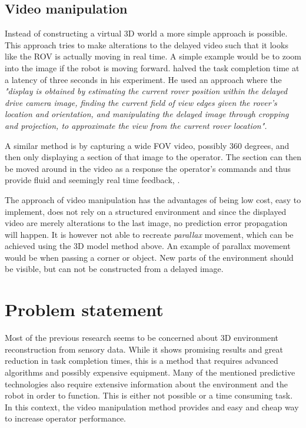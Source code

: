 

\subsection{Video manipulation}

Instead of constructing a virtual 3D world a more simple approach is possible. This approach tries to make alterations to the delayed video such that it looks like the ROV is actually moving in real time. A simple example would be to zoom into the image if the robot is moving forward. \citep{Matheson2013} halved the task completion time at a latency of three seconds in his experiment. He used an approach where the \textit{"display is obtained by estimating the current rover position within the delayed drive camera image, finding the current field of view edges given the rover’s location and orientation, and manipulating the delayed image through cropping and projection, to approximate the view from the current rover location".}

A similar method is by capturing a wide FOV video, possibly 360 degrees, and then only displaying a section of that image to the operator. The section can then be moved around in the video as a response the operator's commands and thus provide fluid and seemingly real time feedback, \citep{Baldwin1999}.

The approach of video manipulation has the advantages of being low cost, easy to implement, does not rely on a structured environment and since the displayed video are merely alterations to the last image, no prediction error propagation will happen. It is however not able to recreate \textit{parallax} movement, which can be achieved using the 3D model method above. An example of parallax movement would be when passing a corner or object. New parts of the environment should be visible, but can not be constructed from a delayed image.

\section{Problem statement}

Most of the previous research seems to be concerned about 3D environment reconstruction from sensory data. While it shows promising results and great reduction in task completion times, this is a method that requires advanced algorithms and possibly expensive equipment. Many of the mentioned predictive technologies also require extensive information about the environment and the robot in order to function. This is either not possible or a time consuming task. In this context, the video manipulation method provides and easy and cheap way to increase operator performance.

